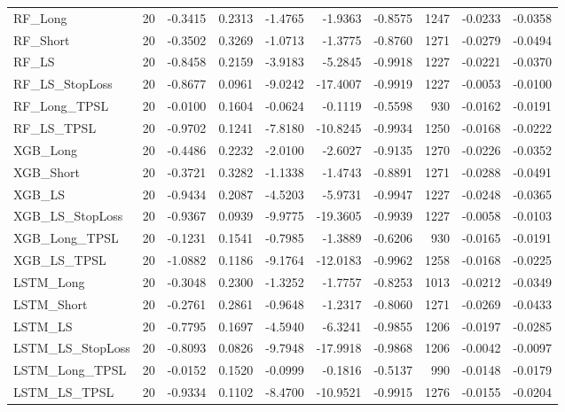 \begin{tabular}{llrrrrrrrr}
\cline{1-10}
RF\_Long & 20 & -0.3415 & 0.2313 & -1.4765 & -1.9363 & -0.8575 & 1247 & -0.0233 & -0.0358 \\
\cline{1-10}
RF\_Short & 20 & -0.3502 & 0.3269 & -1.0713 & -1.3775 & -0.8760 & 1271 & -0.0279 & -0.0494 \\
\cline{1-10}
RF\_LS & 20 & -0.8458 & 0.2159 & -3.9183 & -5.2845 & -0.9918 & 1227 & -0.0221 & -0.0370 \\
\cline{1-10}
RF\_LS\_StopLoss & 20 & -0.8677 & 0.0961 & -9.0242 & -17.4007 & -0.9919 & 1227 & -0.0053 & -0.0100 \\
\cline{1-10}
RF\_Long\_TPSL & 20 & -0.0100 & 0.1604 & -0.0624 & -0.1119 & -0.5598 & 930 & -0.0162 & -0.0191 \\
\cline{1-10}
RF\_LS\_TPSL & 20 & -0.9702 & 0.1241 & -7.8180 & -10.8245 & -0.9934 & 1250 & -0.0168 & -0.0222 \\
\cline{1-10}
XGB\_Long & 20 & -0.4486 & 0.2232 & -2.0100 & -2.6027 & -0.9135 & 1270 & -0.0226 & -0.0352 \\
\cline{1-10}
XGB\_Short & 20 & -0.3721 & 0.3282 & -1.1338 & -1.4743 & -0.8891 & 1271 & -0.0288 & -0.0491 \\
\cline{1-10}
XGB\_LS & 20 & -0.9434 & 0.2087 & -4.5203 & -5.9731 & -0.9947 & 1227 & -0.0248 & -0.0365 \\
\cline{1-10}
XGB\_LS\_StopLoss & 20 & -0.9367 & 0.0939 & -9.9775 & -19.3605 & -0.9939 & 1227 & -0.0058 & -0.0103 \\
\cline{1-10}
XGB\_Long\_TPSL & 20 & -0.1231 & 0.1541 & -0.7985 & -1.3889 & -0.6206 & 930 & -0.0165 & -0.0191 \\
\cline{1-10}
XGB\_LS\_TPSL & 20 & -1.0882 & 0.1186 & -9.1764 & -12.0183 & -0.9962 & 1258 & -0.0168 & -0.0225 \\
\cline{1-10}
LSTM\_Long & 20 & -0.3048 & 0.2300 & -1.3252 & -1.7757 & -0.8253 & 1013 & -0.0212 & -0.0349 \\
\cline{1-10}
LSTM\_Short & 20 & -0.2761 & 0.2861 & -0.9648 & -1.2317 & -0.8060 & 1271 & -0.0269 & -0.0433 \\
\cline{1-10}
LSTM\_LS & 20 & -0.7795 & 0.1697 & -4.5940 & -6.3241 & -0.9855 & 1206 & -0.0197 & -0.0285 \\
\cline{1-10}
LSTM\_LS\_StopLoss & 20 & -0.8093 & 0.0826 & -9.7948 & -17.9918 & -0.9868 & 1206 & -0.0042 & -0.0097 \\
\cline{1-10}
LSTM\_Long\_TPSL & 20 & -0.0152 & 0.1520 & -0.0999 & -0.1816 & -0.5137 & 990 & -0.0148 & -0.0179 \\
\cline{1-10}
LSTM\_LS\_TPSL & 20 & -0.9334 & 0.1102 & -8.4700 & -10.9521 & -0.9915 & 1276 & -0.0155 & -0.0204 \\
\cline{1-10}
\bottomrule
\end{tabular}
